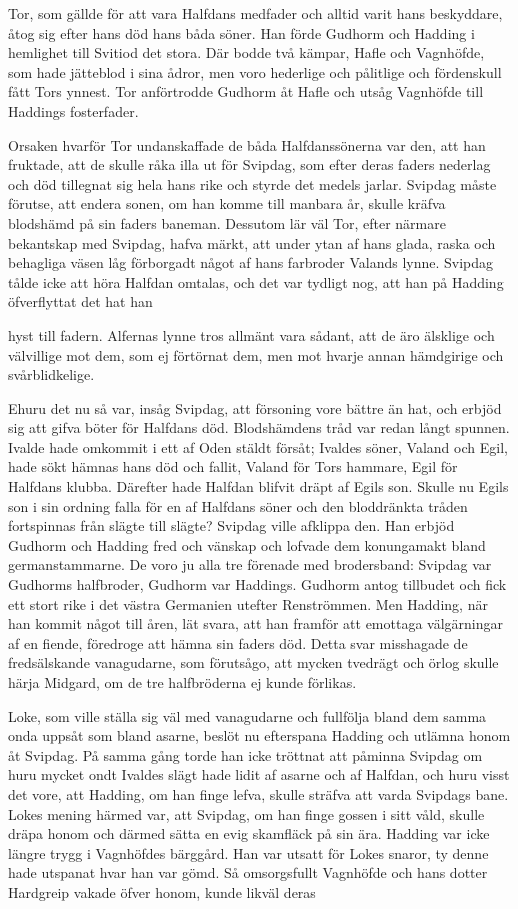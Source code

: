 Tor, som gällde för att vara Halfdans medfader och alltid varit hans
beskyddare, åtog sig efter hans död hans båda söner. Han förde Gudhorm
och Hadding i hemlighet till Svitiod det stora. Där bodde två kämpar,
Hafle och Vagnhöfde, som hade jätteblod i sina ådror, men voro hederlige
och pålitlige och fördenskull fått Tors ynnest. Tor anförtrodde Gudhorm
åt Hafle och utsåg Vagnhöfde till Haddings fosterfader.

Orsaken hvarför Tor undanskaffade de båda Halfdanssönerna var den, att
han fruktade, att de skulle råka illa ut för Svipdag, som efter deras
faders nederlag och död tillegnat sig hela hans rike och styrde det
medels jarlar. Svipdag måste förutse, att endera sonen, om han komme
till manbara år, skulle kräfva blodshämd på sin faders baneman. Dessutom
lär väl Tor, efter närmare bekantskap med Svipdag, hafva märkt, att
under ytan af hans glada, raska och behagliga väsen låg förborgadt något
af hans farbroder Valands lynne. Svipdag tålde icke att höra Halfdan
omtalas, och det var tydligt nog, att han på Hadding öfverflyttat det
hat han

hyst till fadern. Alfernas lynne tros allmänt vara sådant, att de äro
älsklige och välvillige mot dem, som ej förtörnat dem, men mot hvarje
annan hämdgirige och svårblidkelige.

Ehuru det nu så var, insåg Svipdag, att försoning vore bättre än hat,
och erbjöd sig att gifva böter för Halfdans död. Blodshämdens tråd var
redan långt spunnen. Ivalde hade omkommit i ett af Oden stäldt försåt;
Ivaldes söner, Valand och Egil, hade sökt hämnas hans död och fallit,
Valand för Tors hammare, Egil för Halfdans klubba. Därefter hade Halfdan
blifvit dräpt af Egils son. Skulle nu Egils son i sin ordning falla för
en af Halfdans söner och den bloddränkta tråden fortspinnas från slägte
till slägte? Svipdag ville afklippa den. Han erbjöd Gudhorm och Hadding
fred och vänskap och lofvade dem konungamakt bland germanstammarne. De
voro ju alla tre förenade med brodersband: Svipdag var Gudhorms
halfbroder, Gudhorm var Haddings. Gudhorm antog tillbudet och fick ett
stort rike i det västra Germanien utefter Renströmmen. Men Hadding, när
han kommit något till åren, lät svara, att han framför att emottaga
välgärningar af en fiende, föredroge att hämna sin faders död. Detta
svar misshagade de fredsälskande vanagudarne, som förutsågo, att mycken
tvedrägt och örlog skulle härja Midgard, om de tre halfbröderna ej kunde
förlikas.

Loke, som ville ställa sig väl med vanagudarne och fullfölja bland dem
samma onda uppsåt som bland asarne, beslöt nu efterspana Hadding och
utlämna honom åt Svipdag. På samma gång torde han icke tröttnat att
påminna Svipdag om huru mycket ondt Ivaldes slägt hade lidit af asarne
och af Halfdan, och huru visst det vore, att Hadding, om han finge
lefva, skulle sträfva att varda Svipdags bane. Lokes mening härmed var,
att Svipdag, om han finge gossen i sitt våld, skulle dräpa honom och
därmed sätta en evig skamfläck på sin ära. Hadding var icke längre trygg
i Vagnhöfdes bärggård. Han var utsatt för Lokes snaror, ty denne hade
utspanat hvar han var gömd. Så omsorgsfullt Vagnhöfde och hans dotter
Hardgreip vakade öfver honom, kunde likväl deras

